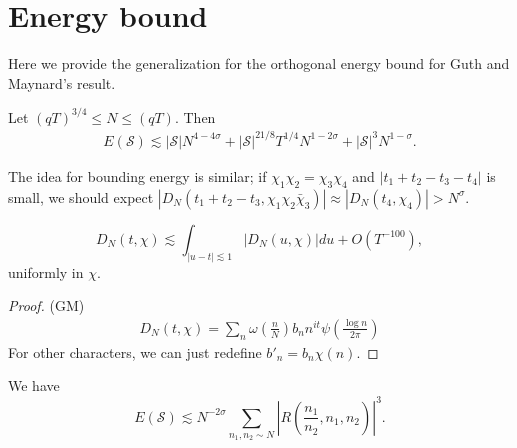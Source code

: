 
\section{Energy bound}
Here we provide the generalization for the orthogonal energy bound for Guth and Maynard's result. 
\begin{proposition}\label{energybound}
    Let $(qT)^{3/4}\leq N\leq (qT)$. Then
    \begin{align*}
E(\mathcal{S})\lesssim |\mathcal{S}|N^{4-4\sigma}+|\mathcal{S}|^{21/8}T^{1/4}N^{1-2\sigma}+|\mathcal{S}|^3N^{1-\sigma}.
    \end{align*}
\end{proposition}
The idea for bounding energy is similar; if $\chi_1\chi_2=\chi_3\chi_4$ and $|t_1+t_2-t_3-t_4|$ is small, we should expect $|D_N(t_1+t_2-t_3,\chi_1\chi_2\bar{\chi}_3)|\approx |D_N(t_4,\chi_4)|>N^\sigma$.
\begin{lemma}
    \label{Dirichletint}
    \[
    D_N(t,\chi)\lesssim \int_{|u-t|\lesssim 1} |D_N(u,\chi)|du + O(T^{-100}),
    \]
    uniformly in $\chi$.
\end{lemma}
\begin{proof}
    (GM)
    \begin{align*}
        D_N(t,\chi)=\sum_n \omega\left(\frac{n}{N}\right) b_n n^{it} \psi\left(\frac{\log n}{2\pi}\right)
    \end{align*}
    For other characters, we can just redefine $b'_n=b_n\chi(n)$.
\end{proof}
\begin{lemma} We have \[
    E(\mathcal{S})\lesssim N^{-2\sigma}\sum_{n_1,n_2\sim N}\left|R\left(\frac{n_1}{n_2},n_1,n_2\right) \right|^3.
    \]
    
\end{lemma}
